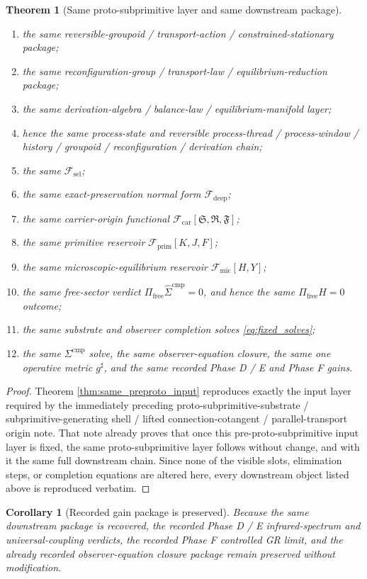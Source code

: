 \documentclass[11pt]{article}
\newcommand{\CompletedMetric}{g^{\sharp}}
\newcommand{\CompLift}{\widehat\Sigma^{\mathrm{cmp}}}
\newcommand{\FreeProj}{\Pi_{\mathrm{free}}}
\newcommand{\GaugeAux}{Y}
\newcommand{\MicFunctional}{\mathscr F_{\mathrm{mic}}}
\newcommand{\PrimFunctional}{\mathscr F_{\mathrm{prim}}}
\newcommand{\CarrierFunctional}{\mathscr F_{\mathrm{car}}}
\newcommand{\DeepFunctional}{\mathscr F_{\mathrm{deep}}}
\newcommand{\StemFunctional}{\mathscr F_{\mathrm{sel}}}
\newcommand{\PrimStrain}{K}
\newcommand{\PrimNeutral}{J}
\newcommand{\PrimFree}{F}
\newcommand{\CarrierSeed}{\mathfrak S}
\newcommand{\RelabelSeed}{\mathfrak R}
\newcommand{\FreeSeed}{\mathfrak F}
\newtheorem{corollary}{Corollary}
\newtheorem{theorem}{Theorem}
\begin{document}
\begin{theorem}[Same proto-subprimitive layer and same downstream package]
\begin{enumerate}
    \item the same reversible-groupoid / transport-action / constrained-stationary package;
    \item the same reconfiguration-group / transport-law / equilibrium-reduction package;
    \item the same derivation-algebra / balance-law / equilibrium-manifold layer;
    \item hence the same process-state and reversible process-thread / process-window / history / groupoid / reconfiguration / derivation chain;
    \item the same \(\StemFunctional\);
    \item the same exact-preservation normal form \(\DeepFunctional\);
    \item the same carrier-origin functional \(\CarrierFunctional[\CarrierSeed,\RelabelSeed,\FreeSeed]\);
    \item the same primitive reservoir \(\PrimFunctional[\PrimStrain,\PrimNeutral,\PrimFree]\);
    \item the same microscopic-equilibrium reservoir \(\MicFunctional[H,\GaugeAux]\);
    \item the same free-sector verdict \(\FreeProj\CompLift=0\), and hence the same \(\Pi_{\mathrm{free}}H=0\) outcome;
    \item the same substrate and observer completion solves \eqref{eq:fixed_solves};
    \item the same \(\Sigma^{\mathrm{cmp}}\) solve, the same observer-equation closure, the same one operative metric \(\CompletedMetric\), and the same recorded Phase D / E and Phase F gains.
\end{enumerate}
\end{theorem}

\begin{proof}
Theorem \ref{thm:same_preproto_input} reproduces exactly the input layer required by the immediately preceding proto-subprimitive-substrate / subprimitive-generating shell / lifted connection-cotangent / parallel-transport origin note. That note already proves that once this pre-proto-subprimitive input layer is fixed, the same proto-subprimitive layer follows without change, and with it the same full downstream chain. Since none of the visible slots, elimination steps, or completion equations are altered here, every downstream object listed above is reproduced verbatim.
\end{proof}

\begin{corollary}[Recorded gain package is preserved]
\label{cor:gains}
Because the same downstream package is recovered, the recorded Phase D / E infrared-spectrum and universal-coupling verdicts, the recorded Phase F controlled GR limit, and the already recorded observer-equation closure package remain preserved without modification.
\end{corollary}
\end{document}
